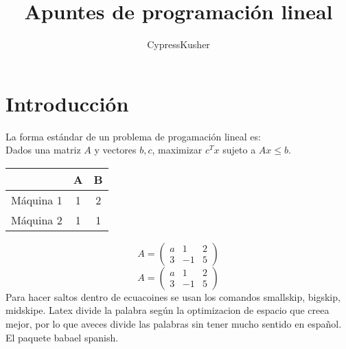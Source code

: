 \documentclass{article}
\title{Apuntes de programación lineal}
\author{CypressKusher}
\begin{document}
\maketitle
\section{Introducción}
\label{sec:introduccion}

La forma estándar de un problema de progamación lineal es:\\
Dados una matriz $A$ y vectores $b,c$, maximizar $c^{T}x$ sujeto a
$Ax\leq b$.

\begin{tabular}{|c|c|c|}
  \hline
  &A&B\\
  \hline
  Máquina 1&1&2\\
  Máquina 2&1&1\\
  \hline
\end{tabular}

\begin{equation*}
  \label{eq:2}
 A= \begin{pmatrix}
    a&1&2\\
    3&-1&5
    
  \end{pmatrix}
\end{equation*}
\midskip
\begin{equation}
  \label{eq:2}
 A= \begin{pmatrix}
    a&1&2\\
    3&-1&5
  \end{pmatrix}
\end{equation}
Para hacer saltos dentro de ecuacoines se usan los comandos smallskip,
bigskip, midskipe.
Latex divide la palabra según la optimizacion de espacio que creea
mejor, por lo que aveces divide las palabras sin tener mucho sentido
en español. El paquete babael spanish.
\end{document}
